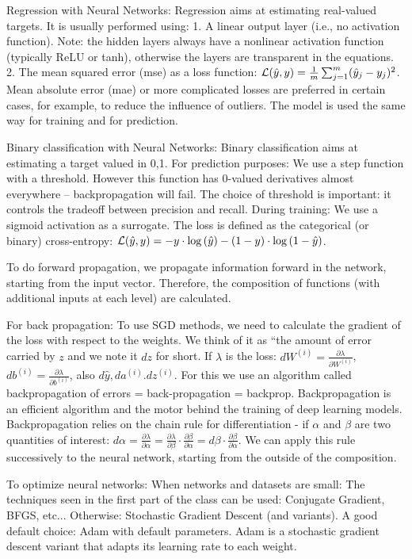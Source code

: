Regression with Neural Networks: Regression aims at estimating real-valued targets.
It is usually performed using:
1. A linear output layer (i.e., no activation function). Note: the hidden layers always have a nonlinear activation function (typically ReLU or tanh), otherwise the layers are transparent in the equations.
2. The mean squared error (mse) as a loss function: $\mathcal{L}(\hat{y}, y) = \frac{1}{m} \sum_{j=1}^m (\hat{y}_j - y_j)^2$.
Mean absolute error (mae) or more complicated losses are preferred in certain cases, for example, to reduce the influence of outliers.
The model is used the same way for training and for prediction.

Binary classification with Neural Networks: Binary classification aims at estimating a target valued in {0,1}.
For prediction purposes:
We use a step function with a threshold.
However this function has 0-valued derivatives almost everywhere – backpropagation will fail. The choice of threshold is important: it controls the tradeoff between precision and recall.
During training:
We use a sigmoid activation as a surrogate.
The loss is defined as the categorical (or binary) cross-entropy:
$\mathcal{L}(\hat{y}, y) = -y \cdot \log{(\hat{y})} - (1-y)\cdot \log{(1-\hat{y})}$.

To do forward propagation, we propagate information forward in the network,
starting from the input vector. Therefore, the composition of functions (with additional inputs at each level) are calculated.

For back propagation:
To use SGD methods, we need to calculate the gradient of the loss with respect to the weights. We think of it as “the amount of error carried by $z$ and we note it $dz$ for short. If $\lambda$ is the loss: 
$dW^{(i)} = \frac{\partial \lambda}{\partial W^{(i)}}$, $db^{(i)} = \frac{\partial \lambda}{\partial b^{(i)}}$, also $d\hat{y}, da^{(i)}. dz^{(i)}$.
For this we use an algorithm called backpropagation of errors = back-propagation = backprop. Backpropagation is an efficient algorithm and the motor behind the training of deep learning models.
Backpropagation relies on the chain rule for differentiation - if $\alpha$ and $\beta$ are two quantities of interest: 
$d\alpha = \frac{\partial \lambda}{\partial \alpha} =  \frac{\partial \lambda}{\partial \beta} \cdot  \frac{\partial \beta}{\partial \alpha} = d\beta \cdot  \frac{\partial \beta}{\partial \alpha}$.
We can apply this rule successively to the neural network, starting from the outside of the composition.

To optimize neural networks: When networks and datasets are small:
The techniques seen in the first part of the class can be used: Conjugate Gradient, BFGS, etc...
Otherwise: Stochastic Gradient Descent (and variants).
A good default choice: Adam with default parameters.
Adam is a stochastic gradient descent variant that adapts its learning rate to each weight.

